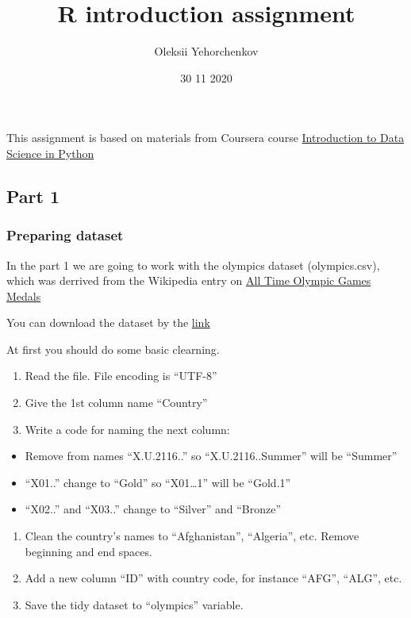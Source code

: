 \documentclass[
]{article}
\title{R introduction assignment}
\author{Oleksii Yehorchenkov}
\date{30 11 2020}
\providecommand{\tightlist}{%
  \setlength{\itemsep}{0pt}\setlength{\parskip}{0pt}}
\begin{document}
\maketitle

This assignment is based on materials from Coursera course
\href{https://www.coursera.org/learn/python-data-analysis/home/welcome}{Introduction
to Data Science in Python}

\hypertarget{part-1}{%
\subsection{Part 1}\label{part-1}}

\hypertarget{preparing-dataset}{%
\subsubsection{Preparing dataset}\label{preparing-dataset}}

In the part 1 we are going to work with the olympics dataset
(olympics.csv), which was derrived from the Wikipedia entry on
\href{https://en.wikipedia.org/wiki/All-time_Olympic_Games_medal_table}{All
Time Olympic Games Medals}

You can download the dataset by the
\href{https://www.dropbox.com/s/9oayr45v7nj30nv/olympics.csv?dl=0}{link}

At first you should do some basic clearning.

\begin{enumerate}
\def\labelenumi{\arabic{enumi}.}
\tightlist
\item
  Read the file. File encoding is ``UTF-8''
\item
  Give the 1st column name ``Country''
\item
  Write a code for naming the next column:
\end{enumerate}

\begin{itemize}
\tightlist
\item
  Remove from names ``X.U.2116..'' so ``X.U.2116..Summer'' will be
  ``Summer''
\item
  ``X01..'' change to ``Gold'' so ``X01\ldots1'' will be ``Gold.1''
\item
  ``X02..'' and ``X03..'' change to ``Silver'' and ``Bronze''
\end{itemize}

\begin{enumerate}
\def\labelenumi{\arabic{enumi}.}
\setcounter{enumi}{3}
\tightlist
\item
  Clean the country's names to ``Afghanistan'', ``Algeria'', etc. Remove
  beginning and end spaces.
\item
  Add a new column ``ID'' with country code, for instance ``AFG'',
  ``ALG'', etc.
\item
  Save the tidy dataset to ``olympics'' variable.
\end{enumerate}
\end{document}
